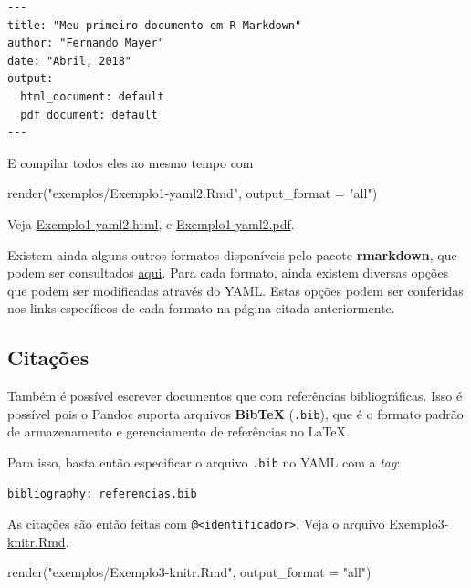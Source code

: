 \documentclass[
  10pt,
  a4paper]{book}
\newenvironment{Shaded}{\begin{snugshade}}{\end{snugshade}}
\newcommand{\AttributeTok}[1]{\textcolor[rgb]{0.77,0.63,0.00}{#1}}
\newcommand{\FunctionTok}[1]{\textcolor[rgb]{0.00,0.00,0.00}{#1}}
\newcommand{\NormalTok}[1]{#1}
\newcommand{\StringTok}[1]{\textcolor[rgb]{0.31,0.60,0.02}{#1}}
\begin{document}
\begin{verbatim}
---
title: "Meu primeiro documento em R Markdown"
author: "Fernando Mayer"
date: "Abril, 2018"
output:
  html_document: default
  pdf_document: default
---
\end{verbatim}

E compilar todos eles ao mesmo tempo com

\begin{Shaded}
\begin{Highlighting}[]
\FunctionTok{render}\NormalTok{(}\StringTok{"exemplos/Exemplo1{-}yaml2.Rmd"}\NormalTok{, }\AttributeTok{output\_format =} \StringTok{"all"}\NormalTok{)}
\end{Highlighting}
\end{Shaded}

Veja \href{exemplos/Exemplo1-yaml2.html}{Exemplo1-yaml2.html}, e
\href{exemplos/Exemplo1-yaml2.pdf}{Exemplo1-yaml2.pdf}.

Existem ainda alguns outros formatos disponíveis pelo pacote
\textbf{rmarkdown}, que podem ser consultados
\href{https://rmarkdown.rstudio.com/formats.html}{aqui}. Para cada formato,
ainda existem diversas opções que podem ser modificadas através do YAML.
Estas opções podem ser conferidas nos links específicos de cada formato
na página citada anteriormente.

\hypertarget{citauxe7uxf5es}{%
\subsection{Citações}\label{citauxe7uxf5es}}

Também é possível escrever documentos que com referências
bibliográficas. Isso é possível pois o Pandoc suporta arquivos
\textbf{BibTeX} (\texttt{.bib}), que é o formato padrão de armazenamento e
gerenciamento de referências no LaTeX.

Para isso, basta então especificar o arquivo \texttt{.bib} no YAML com a \emph{tag}:

\begin{verbatim}
bibliography: referencias.bib
\end{verbatim}

As citações são então feitas com \texttt{@\textless{}identificador\textgreater{}}. Veja o arquivo
\href{exemplos/Exemplo3-knitr.Rmd}{Exemplo3-knitr.Rmd}.

\begin{Shaded}
\begin{Highlighting}[]
\FunctionTok{render}\NormalTok{(}\StringTok{"exemplos/Exemplo3{-}knitr.Rmd"}\NormalTok{, }\AttributeTok{output\_format =} \StringTok{"all"}\NormalTok{)}
\end{Highlighting}
\end{Shaded}
\end{document}
